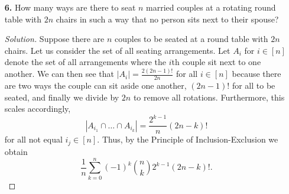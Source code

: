 \documentclass[ 12pt ]{article}
\begin{document}
\begin{enumerate}
		\begin{proof}
			\begin{enumerate}
				\item[\textbf{i.}] Suppose we have base $n$ strings with length $n$. Let $A_i$ for $i \in [n]$ denote the set of all strings where the $i$th character does not occur.
					Clearly, we can see that $|A_i| = (n - 1)^n$ and also, $$|A_{i_1} \cap \hdots \cap A_{i_k}| = (n-k)^n$$ for all not equal $i_j \in [n]$ which gives the number strings
					absent of $k$ specified characters. Then by the Principle of Inclusion-Exclusion, we can see that $\sum_{k = 0}^n (-1)^k \binom{n}{k}(n-k)^n$ represents the number
					of strings with all $n$ characters which is clearly a permutation of $n$ characters. Thus, $$\sum_{k = 0}^n (-1)^k \binom{n}{k}(n-k)^n = n!.$$

				\item[\textbf{ii.}] As we did in \textbf{i}, let us adopt the same sets of strings but generalize the string length to $k$. Then we can see that $\sum_{k = 0}^n
					(-1)^i \binom{n}{i}(n-i)^k$ has a similar connotation but with string length $k$. If $0 \leq k < n$ then we can see that we need to have all $n$ characters
					but we are limited to $k$, thus the sum must evaluate to zero. In the case that $k = n$, then we have the sum seen in \textbf{i} which provides $n!$. Finally,
					if $k > n$, then we must have all $n$ characters with the addition of $k - n$ repeats which is a description of the Stirling numbers of the second kind when
					permutations are accounted for. Hence, the sum evaluates to $n! \begin{Bmatrix} k \\ n \end{Bmatrix}$ in this last case.
			\end{enumerate}
		\end{proof}


	\item[\textbf{6.}] How many ways are there to seat $n$ married couples at a rotating round table with $2n$ chairs in such a way that no person sits next to their spouse?

		\begin{proof}[Solution]
			Suppose there are $n$ couples to be seated at a round table with $2n$ chairs. Let us consider the set of all seating arrangements. Let $A_i$ for $i \in [n]$ denote the set
			of all arrangements where the $i$th couple sit next to one another. We can then see that $|A_i| = \frac{2(2n - 1)!}{2n}$ for all $i \in [n]$ because there are two ways the
			couple can sit aside one another, $(2n-1)!$ for all to be seated, and finally we divide by $2n$ to remove all rotations. Furthermore, this scales accordingly,
			$$|A_{i_1} \cap \hdots \cap A_{i_k}| = \frac{2^{k-1}}{n} (2n - k)!$$ for all not equal $i_j \in [n]$. Thus, by the Principle of Inclusion-Exclusion we obtain
			$$\frac{1}{n} \sum_{k = 0}^n (-1)^k \binom{n}{k} 2^{k-1} (2n - k)!.$$
		\end{proof}

\end{enumerate}
\end{document}
